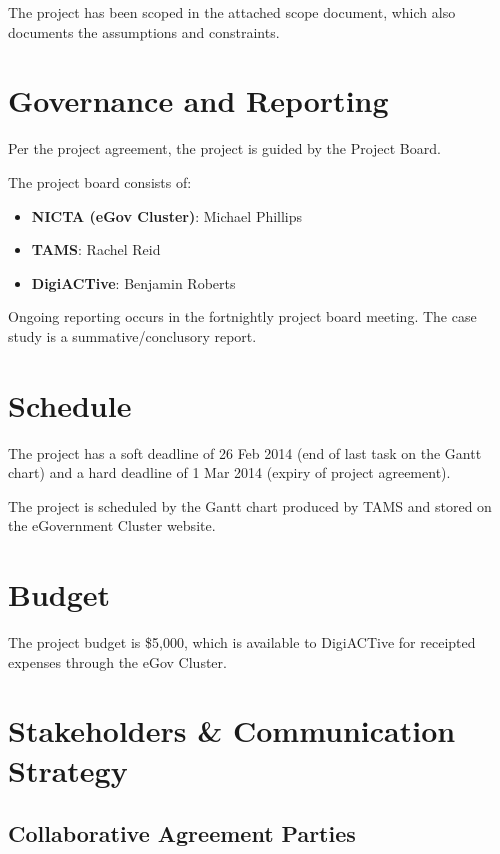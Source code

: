 \documentclass[12pt,a4paper,twosided]{article}
\begin{document}
The project has been scoped in the attached scope document, which also
documents the assumptions and constraints.

\section{Governance and Reporting}

Per the project agreement, the project is guided by the Project Board.

The project board consists of:

\begin{itemize}
\itemsep1pt\parskip0pt
\item
  \textbf{NICTA (eGov Cluster)}: Michael Phillips
\item
  \textbf{TAMS}: Rachel Reid
\item
  \textbf{DigiACTive}: Benjamin Roberts
\end{itemize}

Ongoing reporting occurs in the fortnightly project board meeting. The
case study is a summative/conclusory report.

\section{Schedule}

The project has a soft deadline of 26 Feb 2014 (end of last task on the
Gantt chart) and a hard deadline of 1 Mar 2014 (expiry of project
agreement).

The project is scheduled by the Gantt chart produced by TAMS and stored
on the eGovernment Cluster website.

\section{Budget}

The project budget is \$5,000, which is available to DigiACTive for
receipted expenses through the eGov Cluster.

\section{Stakeholders \& Communication Strategy}

\subsection{Collaborative Agreement Parties}
\end{document}

